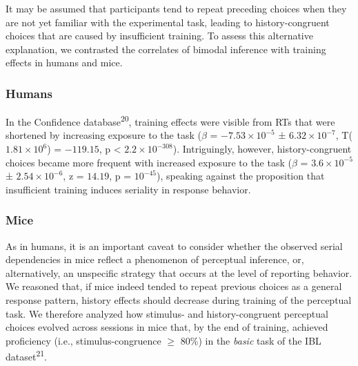 \documentclass[
]{article}
\begin{document}
It may be assumed that participants tend to repeat preceding choices
when they are not yet familiar with the experimental task, leading to
history-congruent choices that are caused by insufficient training. To
assess this alternative explanation, we contrasted the correlates of
bimodal inference with training effects in humans and mice.

\hypertarget{humans-1}{%
\subsubsection{Humans}\label{humans-1}}

In the Confidence database\textsuperscript{20}, training effects were
visible from RTs that were shortened by increasing exposure to the task
(\(\beta\) = \(\ensuremath{-7.53\times 10^{-5}}\) ±
\(\ensuremath{6.32\times 10^{-7}}\),
T(\(\ensuremath{1.81\times 10^{6}}\)) = \(-119.15\), p < \(\ensuremath{2.2\times 10^{-308}}\)).
Intriguingly, however, history-congruent choices became more frequent
with increased exposure to the task (\(\beta\) =
\(\ensuremath{3.6\times 10^{-5}}\) ±
\(\ensuremath{2.54\times 10^{-6}}\), z = \(14.19\), p =
\(\ensuremath{10^{-45}}\)), speaking against the proposition that
insufficient training induces seriality in response behavior.

\hypertarget{mice-1}{%
\subsubsection{Mice}\label{mice-1}}

As in humans, it is an important caveat to consider whether the observed
serial dependencies in mice reflect a phenomenon of perceptual
inference, or, alternatively, an unspecific strategy that occurs at the
level of reporting behavior. We reasoned that, if mice indeed tended to
repeat previous choices as a general response pattern, history effects
should decrease during training of the perceptual task. We therefore
analyzed how stimulus- and history-congruent perceptual choices evolved
across sessions in mice that, by the end of training, achieved
proficiency (i.e., stimulus-congruence \(\geq\) 80\%) in the
\emph{basic} task of the IBL dataset\textsuperscript{21}.
\end{document}
